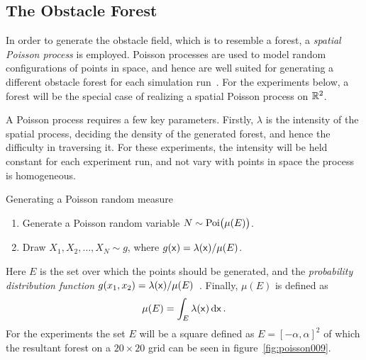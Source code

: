 \subsection{The Obstacle Forest}
\label{sec:Poisson-Process}

In order to generate the obstacle field, which is to resemble a forest, a
\textit{spatial Poisson process} is employed. Poisson processes are used to
model random configurations of points in space, and hence are well suited for
generating a different obstacle forest for each simulation
run~\cite{Kroese_2014}. For the experiments below, a forest will be the special
case of realizing a spatial Poisson process on \(\mathbb{R}^2\).

A Poisson process requires a few key parameters. Firstly, \(\lambda\) is the
intensity of the spatial process, deciding the density of the generated forest,
and hence the difficulty in traversing it. For these experiments, the intensity
will be held constant for each experiment run, and not vary with points in space
\ie the process is homogeneous.

\begin{definition}{Generating a Poisson random measure}
  \label{def:Poisson-def}
  \begin{enumerate}
  \item Generate a Poisson random variable \(N \sim \operatorname{Poi} \bigl( \mu(E) \bigr) \).
  \item Draw \(X_1,X_2,\ldots,X_N \sim g\), where \(g({\mathbf{\mathsf{x}}}) =
    \lambda({\mathbf{\mathsf{x}}})/ \mu(E)\).
  \end{enumerate}
\end{definition}
Here \(E\) is the set over which the points should be generated, and the
\textit{probability distribution function} \(g(x_1, x_2) =
\lambda({\mathbf{\mathsf{x}}})/\mu(E)\)~\cite[Definition~1.1.1]{Kroese_2014}. Finally,
\(\mu(E)\) is defined as
\[
  \mu(E) = \int_{E} \lambda({\mathbf{\mathsf{x}}})\, \mathrm{d} {\mathbf{\mathsf{x}}} \, .
\]
For the experiments the set \(E\) will be a square defined as \(E =
{[-\alpha, \alpha]}^2 \) of which the resultant forest on a \(20 \times 20\)
grid can be seen in figure~\cref{fig:poisson009}.

